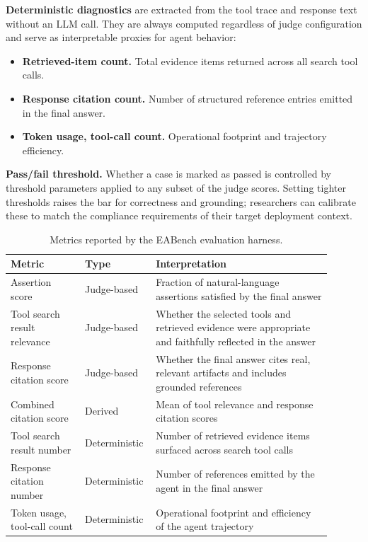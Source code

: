 \textbf{Deterministic diagnostics} are extracted from the tool trace and response text without an LLM call. They are always computed regardless of judge configuration and serve as interpretable proxies for agent behavior:
\begin{itemize}[leftmargin=*,itemsep=2pt,topsep=4pt]
  \item \textbf{Retrieved-item count.} Total evidence items returned across all search tool calls.
  \item \textbf{Response citation count.} Number of structured reference entries emitted in the final answer.
  \item \textbf{Token usage, tool-call count.} Operational footprint and trajectory efficiency.
\end{itemize}

\textbf{Pass/fail threshold.} Whether a case is marked as passed is controlled by threshold parameters applied to any subset of the judge scores. Setting tighter thresholds raises the bar for correctness and grounding; researchers can calibrate these to match the compliance requirements of their target deployment context.

\begin{table}[h]
\centering
\caption{Metrics reported by the EABench evaluation harness.}
\label{tab:eval_metrics}
\small
\begin{tabular}{p{0.22\linewidth}p{0.16\linewidth}p{0.52\linewidth}}
\toprule
\textbf{Metric} & \textbf{Type} & \textbf{Interpretation} \\
\midrule
Assertion score & Judge-based & Fraction of natural-language assertions satisfied by the final answer \\
Tool search result relevance & Judge-based & Whether the selected tools and retrieved evidence were appropriate and faithfully reflected in the answer \\
Response citation score & Judge-based & Whether the final answer cites real, relevant artifacts and includes grounded references \\
Combined citation score & Derived & Mean of tool relevance and response citation scores \\
Tool search result number & Deterministic & Number of retrieved evidence items surfaced across search tool calls \\
Response citation number & Deterministic & Number of references emitted by the agent in the final answer \\
Token usage, tool-call count & Deterministic & Operational footprint and efficiency of the agent trajectory \\
\bottomrule
\end{tabular}

\end{table}

